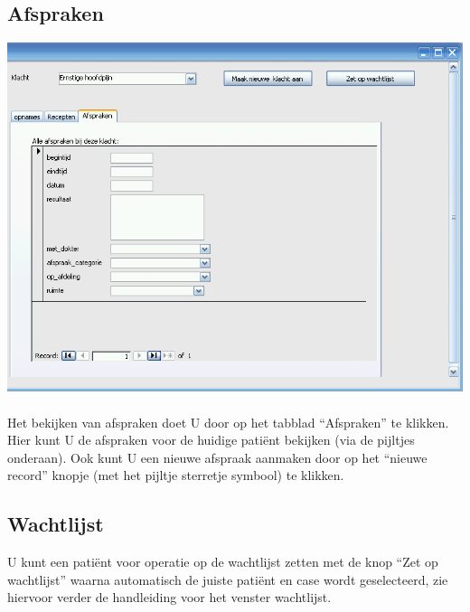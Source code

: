 
\subsection{Afspraken} \label{sec:afspraken}
  \includegraphics[scale=.5,angle=0]{patient4}\\
  \\
  Het bekijken van afspraken doet U door op het tabblad
	``Afspraken'' te klikken. Hier kunt U de afspraken voor de huidige pati\"ent bekijken	(via de pijltjes onderaan). Ook kunt U een nieuwe afspraak	aanmaken door op het ``nieuwe record'' knopje (met het pijltje sterretje symbool) te klikken.


\subsection{Wachtlijst} \label{sec:wachtlijst}
	U kunt een pati\"ent voor operatie op de wachtlijst zetten met de knop ``Zet
	op wachtlijst'' waarna automatisch de juiste pati\"ent en case wordt geselecteerd,
	zie hiervoor verder de handleiding voor het venster wachtlijst.


